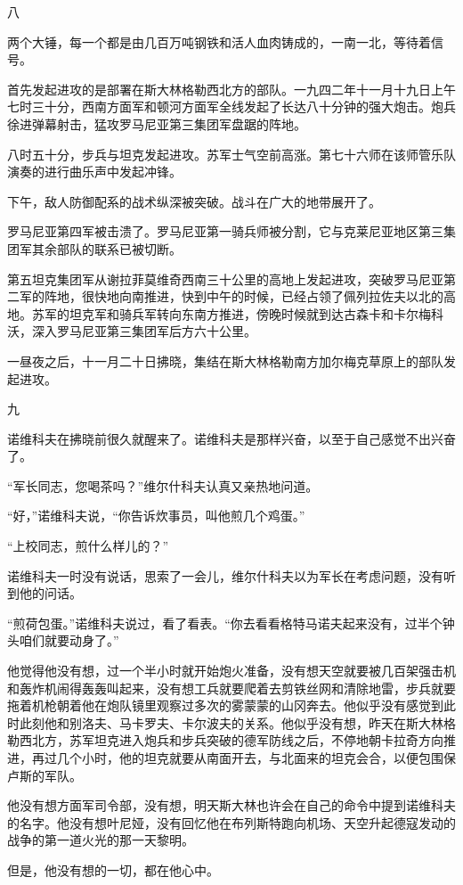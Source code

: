 八

两个大锤，每一个都是由几百万吨钢铁和活人血肉铸成的，一南一北，等待着信号。

首先发起进攻的是部署在斯大林格勒西北方的部队。一九四二年十一月十九日上午七时三十分，西南方面军和顿河方面军全线发起了长达八十分钟的强大炮击。炮兵徐进弹幕射击，猛攻罗马尼亚第三集团军盘踞的阵地。

八时五十分，步兵与坦克发起进攻。苏军士气空前高涨。第七十六师在该师管乐队演奏的进行曲乐声中发起冲锋。

下午，敌人防御配系的战术纵深被突破。战斗在广大的地带展开了。

罗马尼亚第四军被击溃了。罗马尼亚第一骑兵师被分割，它与克莱尼亚地区第三集团军其余部队的联系已被切断。

第五坦克集团军从谢拉菲莫维奇西南三十公里的高地上发起进攻，突破罗马尼亚第二军的阵地，很快地向南推进，快到中午的时候，已经占领了佩列拉佐夫以北的高地。苏军的坦克军和骑兵军转向东南方推进，傍晚时候就到达古森卡和卡尔梅科沃，深入罗马尼亚第三集团军后方六十公里。

一昼夜之后，十一月二十日拂晓，集结在斯大林格勒南方加尔梅克草原上的部队发起进攻。

九

诺维科夫在拂晓前很久就醒来了。诺维科夫是那样兴奋，以至于自己感觉不出兴奋了。

“军长同志，您喝茶吗？”维尔什科夫认真又亲热地问道。

“好，”诺维科夫说，“你告诉炊事员，叫他煎几个鸡蛋。”

“上校同志，煎什么样儿的？”

诺维科夫一时没有说话，思索了一会儿，维尔什科夫以为军长在考虑问题，没有听到他的问话。

“煎荷包蛋。”诺维科夫说过，看了看表。“你去看看格特马诺夫起来没有，过半个钟头咱们就要动身了。”

他觉得他没有想，过一个半小时就开始炮火准备，没有想天空就要被几百架强击机和轰炸机闹得轰轰叫起来，没有想工兵就要爬着去剪铁丝网和清除地雷，步兵就要拖着机枪朝着他在炮队镜里观察过多次的雾蒙蒙的山冈奔去。他似乎没有感觉到此时此刻他和别洛夫、马卡罗夫、卡尔波夫的关系。他似乎没有想，昨天在斯大林格勒西北方，苏军坦克进入炮兵和步兵突破的德军防线之后，不停地朝卡拉奇方向推进，再过几个小时，他的坦克就要从南面开去，与北面来的坦克会合，以便包围保卢斯的军队。

他没有想方面军司令部，没有想，明天斯大林也许会在自己的命令中提到诺维科夫的名字。他没有想叶尼娅，没有回忆他在布列斯特跑向机场、天空升起德寇发动的战争的第一道火光的那一天黎明。

但是，他没有想的一切，都在他心中。

